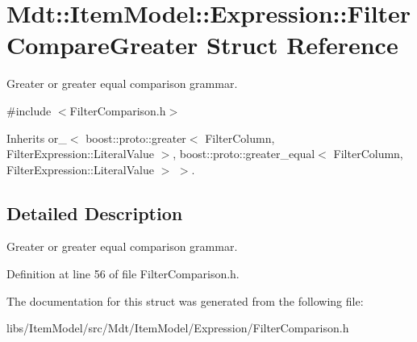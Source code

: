 \hypertarget{struct_mdt_1_1_item_model_1_1_expression_1_1_filter_compare_greater}{}\section{Mdt\+:\+:Item\+Model\+:\+:Expression\+:\+:Filter\+Compare\+Greater Struct Reference}
\label{struct_mdt_1_1_item_model_1_1_expression_1_1_filter_compare_greater}


Greater or greater equal comparison grammar.  




{\ttfamily \#include $<$Filter\+Comparison.\+h$>$}



Inherits or\+\_\+$<$ boost\+::proto\+::greater$<$ Filter\+Column, Filter\+Expression\+::\+Literal\+Value $>$, boost\+::proto\+::greater\+\_\+equal$<$ Filter\+Column, Filter\+Expression\+::\+Literal\+Value $>$ $>$.



\subsection{Detailed Description}
Greater or greater equal comparison grammar. 

Definition at line 56 of file Filter\+Comparison.\+h.



The documentation for this struct was generated from the following file\+:\begin{DoxyCompactItemize}
\item 
libs/\+Item\+Model/src/\+Mdt/\+Item\+Model/\+Expression/Filter\+Comparison.\+h\end{DoxyCompactItemize}
